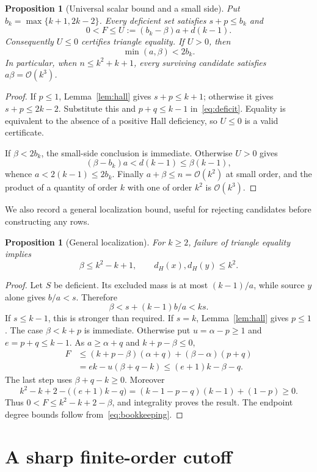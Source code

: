 \documentclass[11pt]{article}
\newtheorem{proposition}[theorem]{Proposition}
\theoremstyle{remark}
\newcommand{\Oh}{\mathcal O}
\begin{document}
\begin{proposition}[Universal scalar bound and a small side]\label{prop:scalar}
Put $b_k=\max\{k+1,2k-2\}$. Every deficient set satisfies $s+p\le b_k$ and
\[
 0<F\le U:=(b_k-\beta)a+d(k-1).
\]
Consequently $U\le0$ certifies triangle equality. If $U>0$, then
\[
 \min(a,\beta)<2b_k.
\]
In particular, when $n\le k^2+k+1$, every surviving candidate satisfies $a\beta=\Oh(k^3)$.
\end{proposition}
\begin{proof}
If $p\le1$, Lemma~\ref{lem:hall} gives $s+p\le k+1$; otherwise it gives $s+p\le2k-2$. Substitute this and $p+q\le k-1$ in~\eqref{eq:deficit}. Equality is equivalent to the absence of a positive Hall deficiency, so $U\le0$ is a valid certificate.

If $\beta<2b_k$, the small-side conclusion is immediate. Otherwise $U>0$ gives
\[
 (\beta-b_k)a<d(k-1)\le\beta(k-1),
\]
whence $a<2(k-1)\le2b_k$. Finally $a+\beta\le n=\Oh(k^2)$ at small order, and the product of a quantity of order $k$ with one of order $k^2$ is $\Oh(k^3)$.
\end{proof}

We also record a general localization bound, useful for rejecting candidates before constructing any rows.

\begin{proposition}[General localization]\label{prop:global}
For $k\ge2$, failure of triangle equality implies
\[
 \beta\le k^2-k+1,\qquad d_H(x),d_H(y)\le k^2.
\]
\end{proposition}
\begin{proof}
Let $S$ be deficient. Its excluded mass is at most $(k-1)/a$, while source $y$ alone gives $b/a<s$. Therefore
\[
 \beta<s+(k-1)b/a<ks.
\]
If $s\le k-1$, this is stronger than required. If $s=k$, Lemma~\ref{lem:hall} gives $p\le1$. The case $\beta<k+p$ is immediate. Otherwise put $u=\alpha-p\ge1$ and $e=p+q\le k-1$. As $a\ge\alpha+q$ and $k+p-\beta\le0$,
\begin{align*}
 F&\le(k+p-\beta)(\alpha+q)+(\beta-\alpha)(p+q)\\
  &=ek-u(\beta+q-k)\le(e+1)k-\beta-q.
\end{align*}
The last step uses $\beta+q-k\ge0$. Moreover
\[
 k^2-k+2-\bigl((e+1)k-q\bigr)
 =(k-1-p-q)(k-1)+(1-p)\ge0.
\]
Thus $0<F\le k^2-k+2-\beta$, and integrality proves the result. The endpoint degree bounds follow from~\eqref{eq:bookkeeping}.
\end{proof}

\section{A sharp finite-order cutoff}\label{sec:cutoff}
\end{document}
